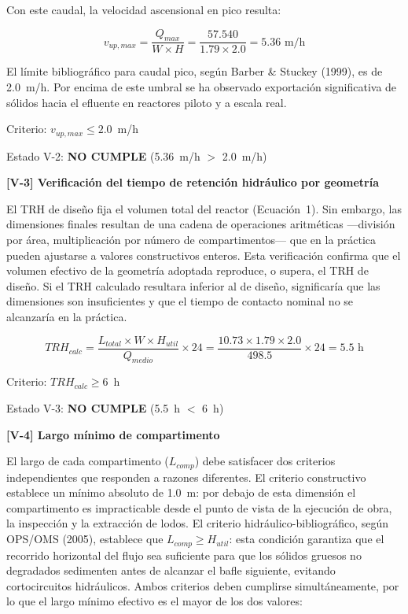\documentclass[12pt,a4paper]{article}
\begin{document}
Con este caudal, la velocidad ascensional en pico resulta:

\begin{equation}
v_{up,max} = \frac{Q_{max}}{W \times H} = \frac{57.540}{1.79 \times 2.0} = 5.36 \text{ m/h}
\end{equation}

El límite bibliográfico para caudal pico, según Barber \& Stuckey (1999), es de 2.0~m/h. Por encima de este umbral se ha observado exportación significativa de sólidos hacia el efluente en reactores piloto y a escala real.

Criterio: $v_{up,max} \leq 2.0$~m/h

Estado V-2: \textbf{NO CUMPLE} (5.36~m/h $>$ 2.0~m/h)

\textbf{[V-3] Verificación del tiempo de retención hidráulico por geometría}

El TRH de diseño fija el volumen total del reactor (Ecuación~1). Sin embargo, las dimensiones finales resultan de una cadena de operaciones aritméticas ---división por área, multiplicación por número de compartimentos--- que en la práctica pueden ajustarse a valores constructivos enteros. Esta verificación confirma que el volumen efectivo de la geometría adoptada reproduce, o supera, el TRH de diseño. Si el TRH calculado resultara inferior al de diseño, significaría que las dimensiones son insuficientes y que el tiempo de contacto nominal no se alcanzaría en la práctica.

\begin{equation}
TRH_{calc} = \frac{L_{total} \times W \times H_{util}}{Q_{medio}} \times 24 = \frac{10.73 \times 1.79 \times 2.0}{498.5} \times 24 = 5.5 \text{ h}
\end{equation}

Criterio: $TRH_{calc} \geq 6$~h

Estado V-3: \textbf{NO CUMPLE} (5.5~h $<$ 6~h)

\textbf{[V-4] Largo mínimo de compartimento}

El largo de cada compartimento ($L_{comp}$) debe satisfacer dos criterios independientes que responden a razones diferentes. El criterio constructivo establece un mínimo absoluto de 1.0~m: por debajo de esta dimensión el compartimento es impracticable desde el punto de vista de la ejecución de obra, la inspección y la extracción de lodos. El criterio hidráulico-bibliográfico, según OPS/OMS (2005), establece que $L_{comp} \geq H_{util}$: esta condición garantiza que el recorrido horizontal del flujo sea suficiente para que los sólidos gruesos no degradados sedimenten antes de alcanzar el bafle siguiente, evitando cortocircuitos hidráulicos. Ambos criterios deben cumplirse simultáneamente, por lo que el largo mínimo efectivo es el mayor de los dos valores:
\end{document}

